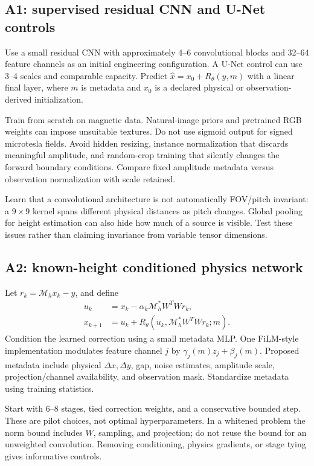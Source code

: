 \subsection{A1: supervised residual CNN and U-Net controls}
Use a small residual CNN with approximately 4--6 convolutional blocks and 32--64 feature channels as an initial engineering configuration. A U-Net control can use 3--4 scales and comparable capacity. Predict $\hat x=x_0+R_\theta(y,m)$ with a linear final layer, where $m$ is metadata and $x_0$ is a declared physical or observation-derived initialization.

Train from scratch on magnetic data. Natural-image priors and pretrained RGB weights can impose unsuitable textures. Do not use sigmoid output for signed microtesla fields. Avoid hidden resizing, instance normalization that discards meaningful amplitude, and random-crop training that silently changes the forward boundary conditions. Compare fixed amplitude metadata versus observation normalization with scale retained.

Learn that a convolutional architecture is not automatically FOV/pitch invariant: a $9\times9$ kernel spans different physical distances as pitch changes. Global pooling for height estimation can also hide how much of a source is visible. Test these issues rather than claiming invariance from variable tensor dimensions.

\subsection{A2: known-height conditioned physics network}
Let $r_k=\mathcal M_hx_k-y$, and define
\begin{align}
 u_k &= x_k-\alpha_k\mathcal M_h^*W^TW r_k,\\
 x_{k+1}&=u_k+R_\theta(u_k,\mathcal M_h^*W^TW r_k;m).
\end{align}
Condition the learned correction using a small metadata MLP. One FiLM-style implementation modulates feature channel $j$ by $\gamma_j(m)z_j+\beta_j(m)$. Proposed metadata include physical $\Delta x,\Delta y$, gap, noise estimates, amplitude scale, projection/channel availability, and observation mask. Standardize metadata using training statistics.

Start with 6--8 stages, tied correction weights, and a conservative bounded step. These are pilot choices, not optimal hyperparameters. In a whitened problem the norm bound includes $W$, sampling, and projection; do not reuse the bound for an unweighted convolution. Removing conditioning, physics gradients, or stage tying gives informative controls.

